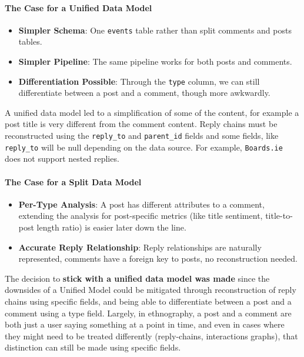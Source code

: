 \documentclass[12pt, a4paper]{article}
\begin{document}
\paragraph{The Case for a Unified Data Model}
\begin{itemize}
    \item \textbf{Simpler Schema}: One \texttt{events} table rather than split comments and posts tables.
    \item \textbf{Simpler Pipeline}: The same pipeline works for both posts and comments.
    \item \textbf{Differentiation Possible}: Through the \texttt{type} column, we can still differentiate between a post and a comment, though more awkwardly.
\end{itemize}

A unified data model led to a simplification of some of the content, for example a post title is very different from the comment content. Reply chains must be reconstructed using the \texttt{reply\_to} and \texttt{parent\_id} fields and some fields, like \texttt{reply\_to} will be null depending on the data source. For example, \texttt{Boards.ie} does not support nested replies.

\paragraph{The Case for a Split Data Model}
\begin{itemize}
    \item \textbf{Per-Type Analysis}: A post has different attributes to a comment, extending the analysis for post-specific metrics (like title sentiment, title-to-post length ratio) is easier later down the line.
    \item \textbf{Accurate Reply Relationship}: Reply relationships are naturally represented, comments have a foreign key to posts, no reconstruction needed.
\end{itemize}

The decision to \textbf{stick with a unified data model was made} since the downsides of a Unified Model could be mitigated through reconstruction of reply chains using specific fields, and being able to differentiate between a post and a comment using a type field. Largely, in ethnography, a post and a comment are both just a user saying something at a point in time, and even in cases where they might need to be treated differently (reply-chains, interactions graphs), that distinction can still be made using specific fields.
\end{document}
